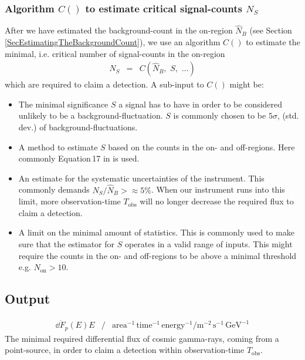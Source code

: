 \documentclass{article}%
\begin{document}
\subsubsection{Algorithm $C()$ to estimate critical signal-counts $N_S$}
%
After we have estimated the background-count in the on-region $\hat{N}_B$ (see Section \ref{SecEstimatingTheBackgroundCount}), we use an algorithm $C()$ to estimate the minimal, i.e. critical number of signal-counts in the on-region
%
\begin{eqnarray*}
N_S &=& C(\hat{N}_B,\,\,S,\,\,\dots)
\end{eqnarray*}
%
which are required to claim a detection.
%
A sub-input to $C()$ might be:
%
\begin{itemize}
\item{} The minimal significance $S$ a signal has to have in order to be considered unlikely to be a background-fluctuation.
%
$S$ is commonly chosen to be $5\sigma$, (std.\,dev.) of background-fluctuations.
%
\item{} A method to estimate $S$ based on the counts in the on- and off-regions. Here commonly Equation\,17 in \cite{li1983analysis} is used.
%
\item{} An estimate for the systematic uncertainties of the instrument. This commonly demands $N_S/\hat{N}_B >\approx 5\%$.
%
When our instrument runs into this limit, more observation-time $T_\text{obs}$ will no longer decrease the required flux to claim a detection.
%
\item{}
A limit on the minimal amount of statistics. This is commonly used to make sure that the estimator for $S$ operates in a valid range of inputs.
%
This might require the counts in the on- and off-regions to be above a minimal threshold e.g. $N_\text{on} > 10$.
%
\end{itemize}
%
\subsection{Output}
%
\begin{eqnarray*}
\dd{\dot{F}_p(E)}{E} &/&
\text{area}^{-1}\,\text{time}^{-1}\,\text{energy}^{-1} /
\text{m}^{-2}\,\text{s}^{-1}\,\text{GeV}^{-1}
\end{eqnarray*}
%
The minimal required differential flux of cosmic gamma-rays, coming from a point-source, in order to claim a detection within observation-time $T_\text{obs}$.
%
\end{document}
